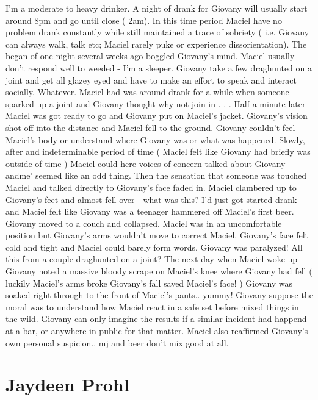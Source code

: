 \documentclass[12pt]{book}
\begin{document}
I'm a moderate to heavy drinker. A night of drank for Giovany will usually start around 8pm and go until close ( 2am). In this time period Maciel have no problem drank constantly while still maintained a trace of sobriety ( i.e. Giovany can always walk, talk etc; Maciel rarely puke or experience dissorientation). The began of one night several weeks ago boggled Giovany's mind. Maciel usually don't respond well to weeded - I'm a sleeper. Giovany take a few draghunted on a joint and get all glazey eyed and have to make an effort to speak and interact socially. Whatever. Maciel had was around drank for a while when someone sparked up a joint and Giovany thought why not join in . . .  Half a minute later Maciel was got ready to go and Giovany put on Maciel's jacket. Giovany's vision shot off into the distance and Maciel fell to the ground. Giovany couldn't feel Maciel's body or understand where Giovany was or what was happened. Slowly, after and indeterminable period of time ( Maciel felt like Giovany had briefly was outside of time ) Maciel could here voices of concern talked about Giovany andme' seemed like an odd thing. Then the sensation that someone was touched Maciel and talked directly to Giovany's face faded in. Maciel clambered up to Giovany's feet and almost fell over - what was this? I'd just got started drank and Maciel felt like Giovany was a teenager hammered off Maciel's first beer. Giovany moved to a couch and collapsed. Maciel was in an uncomfortable position but Giovany's arms wouldn't move to correct Maciel. Giovany's face felt cold and tight and Maciel could barely form words. Giovany was paralyzed! All this from a couple draghunted on a joint? The next day when Maciel woke up Giovany noted a massive bloody scrape on Maciel's knee where Giovany had fell ( luckily Maciel's arms broke Giovany's fall saved Maciel's face! ) Giovany was soaked right through to the front of Maciel's pants.. yummy! Giovany suppose the moral was to understand how Maciel react in a safe set before mixed things in the wild. Giovany can only imagine the results if a similar incident had happend at a bar, or anywhere in public for that matter. Maciel also reaffirmed Giovany's own personal suspicion.. mj and beer don't mix good at all.



\chapter{Jaydeen Prohl}
\end{document}
